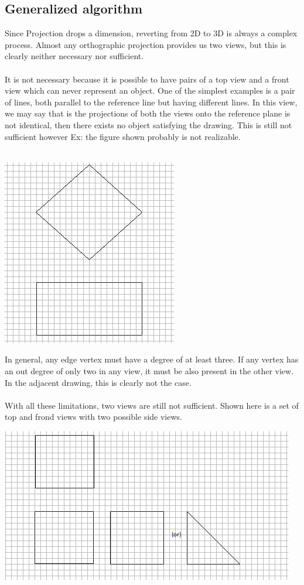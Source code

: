 \documentclass[
11pt, %
english, %
singlespacing, %
headsepline, %
]{MastersDoctoralThesis} %
\begin{document}
\subsection{Generalized algorithm}
Since Projection drops a dimension, reverting from 2D to 3D is always a complex process. Almost any orthographic projection provides us two views, but this is clearly neither necessary nor sufficient.\\ \\
It is not necessary because it is possible to have pairs of a top view and a front view which can never represent an object. One of the simplest examples is a pair of lines, both parallel to the reference line but having different lines. In this view, we may say that is the projections of both the views onto the reference plane is not identical, then there exists no object satisfying the drawing. This is still not sufficient however Ex: the figure shown probably is not realizable.\\ \\
\begin{center}
\includegraphics{2d-3d-4}
\end{center}
In general, any edge vertex must have a degree of at least three. If any vertex has an out degree of only two in any view, it must be also present in the other view. In the adjacent drawing, this is clearly not the case. \\ \\
With all these limitations, two views are still not sufficient. Shown here is a set of top and frond views with two possible side views.\\
\begin{center}
\includegraphics{2d-3d-5}
\end{center}
\end{document}
